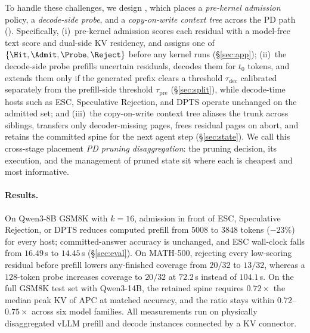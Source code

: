 To handle these challenges, we design \sys, which places a \emph{pre-kernel admission} policy, a \emph{decode-side probe}, and a \emph{copy-on-write context tree} across the PD path ().
Specifically, (i)~pre-kernel admission scores each residual with a model-free text score and dual-side KV residency, and assigns one of $\{\Hit,\Admit,\Probe,\Reject\}$ before any kernel runs (\S\ref{sec:app}); (ii)~the decode-side probe prefills uncertain residuals, decodes them for $t_0$ tokens, and extends them only if the generated prefix clears a threshold $\tau_{\mathrm{dec}}$ calibrated separately from the prefill-side threshold $\tau_{\mathrm{pre}}$ (\S\ref{sec:split}), while decode-time hosts such as ESC, Speculative Rejection, and DPTS operate unchanged on the admitted set; and (iii)~the copy-on-write context tree aliases the trunk across siblings, transfers only decoder-missing pages, frees residual pages on abort, and retains the committed spine for the next agent step (\S\ref{sec:state}).
We call this cross-stage placement \emph{PD pruning disaggregation}: the pruning decision, its execution, and the management of pruned state sit where each is cheapest and most informative.

\paragraph{Results.}
On Qwen3-8B GSM8K with $k{=}16$, admission in front of ESC, Speculative Rejection, or DPTS reduces computed prefill from $5008$ to $3848$ tokens ($-23\%$) for every host; committed-answer accuracy is unchanged, and ESC wall-clock falls from $16.49$\,s to $14.45$\,s (\S\ref{sec:eval}).
On MATH-500, rejecting every low-scoring residual before prefill lowers any-finished coverage from $20/32$ to $13/32$, whereas a $128$-token probe increases coverage to $20/32$ at $72.2$\,s instead of $104.1$\,s.
On the full GSM8K test set with Qwen3-14B, the retained spine requires $0.72\times$ the median peak KV of APC at matched accuracy, and the ratio stays within $0.72$--$0.75\times$ across six model families.
All measurements run on physically disaggregated vLLM prefill and decode instances connected by a KV connector.

